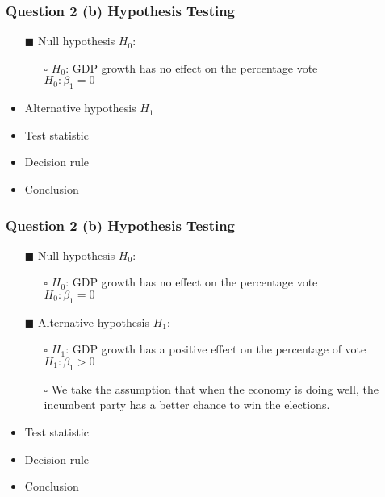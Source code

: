 \documentclass[11pt, xcolor=x11names,compress]{beamer}
\begin{document}
\begin{frame}[fragile,t]
\frametitle{Question 2 (b) Hypothesis Testing} 
\linespread{1.15}
\begin{itemize}
    \item [$\blacksquare$] Null hypothesis $H_0$:
    \begin{itemize}
        \item [$\square$] $H_0$: GDP growth has no effect on the percentage vote\\
              $H_0: \beta_1 = 0$
    \end{itemize}
    \item Alternative hypothesis $H_1$
    \item Test statistic
    \item Decision rule
    \item Conclusion
\end{itemize}
\end{frame}
\begin{frame}[fragile,t]
\frametitle{Question 2 (b) Hypothesis Testing} 
\linespread{1.15}
\begin{itemize}
    \item [$\blacksquare$] Null hypothesis $H_0$:
    \begin{itemize}
        \item [$\square$] $H_0$: GDP growth has no effect on the percentage vote\\
              $H_0: \beta_1 = 0$
    \end{itemize}
    \item [$\blacksquare$] Alternative hypothesis $H_1$:
    \begin{itemize}
        \item [$\square$] $H_1$: GDP growth has a positive effect on the percentage of vote\\
              $H_1: \beta_1 > 0$
        \item [$\square$] We take the assumption that when the economy is doing well, the incumbent party has a better chance to win the elections.  
    \end{itemize}    
    \item Test statistic
    \item Decision rule
    \item Conclusion
\end{itemize}
\end{frame}
\end{document}
